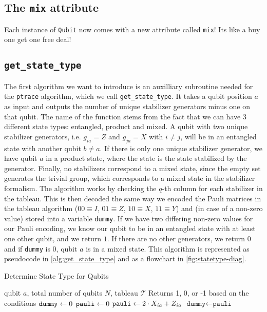 \subsection{The \texttt{mix} attribute}
Each instance of \texttt{Qubit} now comes with a new attribute called
\texttt{mix}! Its like a buy one get one free deal!

\subsection{\texttt{get\_state\_type}}
The first algorithm we want to introduce is an auxilliary subroutine needed for
the \texttt{ptrace} algorithm, which we call \texttt{get\_state\_type}. It
takes a qubit position $a$ as input and outputs the number of unique stabilizer
generators minus one on that qubit. The name of the function stems from the
fact that we can have $3$ different state types: entangled, product and mixed.
A qubit with two unique stabilizer generators, i.e. $g_{ia} = Z$ and $g_{ja} =
X$ with $i\neq j$, will be in an entangled state with another qubit $b\neq a$.
If there is only one unique stabilizer generator, we have qubit $a$ in a
product state, where the state is the state stabilized by the generator.
Finally, no stabilizers correspond to a mixed state, since the empty set
generates the trivial group, which corresponds to a mixed state in the
stabilizer formalism. The algorithm works by checking the $q$-th column for
each stabilizer in the tableau. This is then decoded the same way we encoded
the Pauli matrices in the tableau algorithm ($00 \equiv I$, $01\equiv Z$, $10
\equiv X$, $11 \equiv Y$) and (in case of a non-zero value) stored into a
variable \texttt{dummy}. If we have two differing non-zero values for our Pauli
encoding, we know our qubit to be in an entangled state with at least one other
qubit, and we return $1$. If there are no other generators, we return $0$ and
if \texttt{dummy} is $0$, qubit $a$ is in a mixed state. This algorithm is
represented as pseudocode in \cref{alg:get_state_type} and as a flowchart in
\cref{fig:statetype-diag}.

\begin{algorithm}[H]
\caption{Determine State Type for Qubits}
\label{alg:get_state_type}
\begin{algorithmic}[1]
\REQUIRE qubit $a$, total number of qubits $N$, tableau $\mathcal{T}$
\ENSURE Returns 1, 0, or -1 based on the conditions
\STATE $\verb|dummy| \leftarrow 0$
\STATE $\verb|pauli| \leftarrow 0$
  \STATE $\verb|pauli| \leftarrow 2\cdot X_{ia} + Z_{ia}$
        \STATE $\texttt{dummy} \leftarrow \texttt{pauli}$
    \ENDIF
\ENDFOR
{}
\ELSE
\ENDIF
\end{algorithmic}
\end{algorithm}

